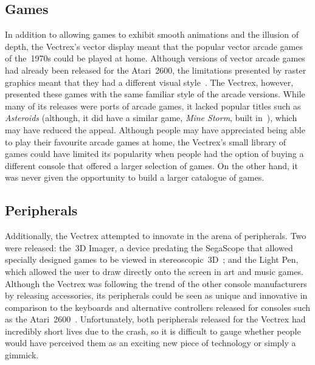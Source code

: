 \documentclass{scrartcl}
\begin{document}
\subsection*{Games}
In addition to allowing games to exhibit smooth animations and the illusion of depth, the Vectrex's vector display meant that the popular vector arcade games of the~1970s could be played at home. Although versions of vector arcade games had already been released for the Atari~2600, the limitations presented by raster graphics meant that they had a different visual style~\cite{montfort:random}. The Vectrex, however, presented these games with the same familiar style of the arcade versions. While many of its releases were ports of arcade games, it lacked popular titles such as \textit{Asteroids} (although, it did have a similar game, \textit{Mine Storm}, built in~\cite[p. 289]{baer:supercade}), which may have reduced the appeal. Although people may have appreciated being able to play their favourite arcade games at home, the Vectrex's small library of games could have limited its popularity when people had the option of buying a different console that offered a larger selection of games. On the other hand, it was never given the opportunity to build a larger catalogue of games. 


\subsection*{Peripherals} 
Additionally, the Vectrex attempted to innovate in the arena of peripherals. Two were released: the~3D Imager, a device predating the SegaScope that allowed specially designed games to be viewed in stereoscopic~3D~\cite{zachara:stereo}; and the Light Pen, which allowed the user to draw directly onto the screen in art and music games. Although the Vectrex was following the trend of the other console manufacturers by releasing accessories, its peripherals could be seen as unique and innovative in comparison to the keyboards and alternative controllers released for consoles such as the Atari~2600~\cite[pp. 24, 62]{montfort:beam}. Unfortunately, both peripherals released for the Vectrex had incredibly short lives due to the crash, so it is difficult to gauge whether people would have perceived them as an exciting new piece of technology or simply a gimmick.

\end{document}
